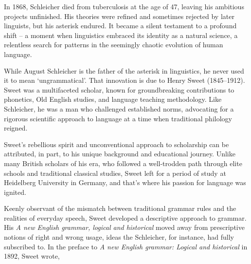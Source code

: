 In 1868, Schleicher died from tuberculosis at the age of 47, leaving his ambitious projects unfinished. His theories were refined and sometimes rejected by later linguists, but his asterisk endured. It became a silent testament to a profound shift -- a moment when linguistics embraced its identity as a natural science, a relentless search for patterns in the seemingly chaotic evolution of human language.

\bigskip

While August Schleicher is the father of the asterisk in linguistics, he never used it to mean `ungrammatical'. That innovation is due to Henry Sweet (1845--1912). Sweet was a multifaceted scholar, known for groundbreaking contributions to phonetics, Old English studies, and language teaching methodology. Like Schleicher, he was a man who challenged established norms, advocating for a rigorous scientific approach to language at a time when traditional philology reigned.

Sweet's rebellious spirit and unconventional approach to scholarship can be attributed, in part, to his unique background and educational journey. Unlike many British scholars of his era, who followed a well-trodden path through elite schools and traditional classical studies, Sweet left for a period of study at Heidelberg University in Germany, and that's where his passion for language was ignited.



Keenly observant of the mismatch between traditional grammar rules and the realities of everyday speech, Sweet developed a descriptive approach to grammar. His \textit{A  new English grammar, logical and historical} moved away from prescriptive notions of right and wrong usage, ideas the Schleicher, for instance, had fully subscribed to. In the preface to \textit{A new English grammar: Logical and historical} in 1892, Sweet wrote,

